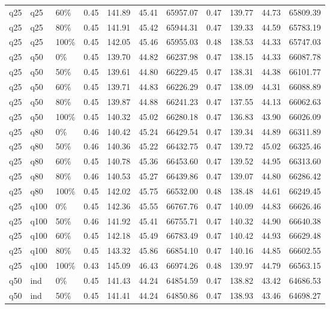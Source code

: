 \begin{longtable}{lllrrrrrrrr}
  q25 & q25 & 60\% & 0.45 & 141.89 & 45.41 & 65957.07 & 0.47 & 139.77 & 44.73 & 65809.39 \\ 
  q25 & q25 & 80\% & 0.45 & 141.91 & 45.42 & 65944.31 & 0.47 & 139.33 & 44.59 & 65783.19 \\ 
  q25 & q25 & 100\% & 0.45 & 142.05 & 45.46 & 65955.03 & 0.48 & 138.53 & 44.33 & 65747.03 \\ 
  q25 & q50 & 0\% & 0.45 & 139.70 & 44.82 & 66237.98 & 0.47 & 138.15 & 44.33 & 66087.78 \\ 
  q25 & q50 & 50\% & 0.45 & 139.61 & 44.80 & 66229.45 & 0.47 & 138.31 & 44.38 & 66101.77 \\ 
  q25 & q50 & 60\% & 0.45 & 139.71 & 44.83 & 66226.29 & 0.47 & 138.09 & 44.31 & 66088.89 \\ 
  q25 & q50 & 80\% & 0.45 & 139.87 & 44.88 & 66241.23 & 0.47 & 137.55 & 44.13 & 66062.63 \\ 
  q25 & q50 & 100\% & 0.45 & 140.32 & 45.02 & 66280.18 & 0.47 & 136.83 & 43.90 & 66026.09 \\ 
  q25 & q80 & 0\% & 0.46 & 140.42 & 45.24 & 66429.54 & 0.47 & 139.34 & 44.89 & 66311.89 \\ 
  q25 & q80 & 50\% & 0.46 & 140.36 & 45.22 & 66432.75 & 0.47 & 139.72 & 45.02 & 66325.46 \\ 
  q25 & q80 & 60\% & 0.45 & 140.78 & 45.36 & 66453.60 & 0.47 & 139.52 & 44.95 & 66313.60 \\ 
  q25 & q80 & 80\% & 0.46 & 140.53 & 45.27 & 66439.86 & 0.47 & 139.07 & 44.80 & 66286.42 \\ 
  q25 & q80 & 100\% & 0.45 & 142.02 & 45.75 & 66532.00 & 0.48 & 138.48 & 44.61 & 66249.45 \\ 
  q25 & q100 & 0\% & 0.45 & 142.36 & 45.55 & 66767.76 & 0.47 & 140.09 & 44.83 & 66626.46 \\ 
  q25 & q100 & 50\% & 0.46 & 141.92 & 45.41 & 66755.71 & 0.47 & 140.32 & 44.90 & 66640.38 \\ 
  q25 & q100 & 60\% & 0.45 & 142.18 & 45.49 & 66783.49 & 0.47 & 140.42 & 44.93 & 66629.48 \\ 
  q25 & q100 & 80\% & 0.45 & 143.32 & 45.86 & 66854.10 & 0.47 & 140.16 & 44.85 & 66602.55 \\ 
  q25 & q100 & 100\% & 0.43 & 145.09 & 46.43 & 66974.26 & 0.48 & 139.97 & 44.79 & 66563.15 \\ 
  q50 & ind & 0\% & 0.45 & 141.43 & 44.24 & 64854.59 & 0.47 & 138.82 & 43.42 & 64686.53 \\ 
  q50 & ind & 50\% & 0.45 & 141.41 & 44.24 & 64850.86 & 0.47 & 138.93 & 43.46 & 64698.27 \\ 

\end{longtable}
